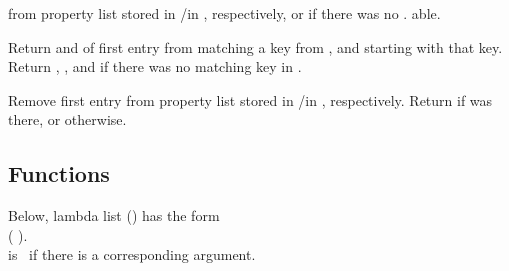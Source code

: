 \begin{LIST}{1cm}
  \label{:property_lists}
  {
   from property list stored in
  /in , respectively, or  if
  there was no . able.
  }

  {
  Return  and  of first entry from 
  matching a key from , and  starting with that key. Return \retval{\NIL},
  \retvalii{\NIL}, and  \retvaliii{\NIL} if there was no matching key
  in .
  }

  {
  Remove first entry  from property list stored in
  /in , respectively. Return \retval{\T} if 
  was there, or \retval{\NIL} otherwise.
  }

\end{LIST}


\subsection{Functions}
\label{section:Functions}

\begin{flushleft}
  Below, lambda list () has the form\\
  (
  ).\\
   is \T\ if there is a corresponding argument.
\end{flushleft}

